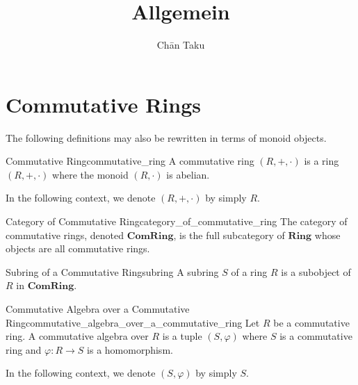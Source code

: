 \documentclass{article}
\title{Allgemein}
\author{Ch\=an Taku}
\begin{document}
\maketitle

\section{Commutative Rings}

The following definitions may also be rewritten in terms of monoid objects.

\begin{definition}{Commutative Ring}{commutative_ring}
    A commutative ring $(R,+,\cdot)$ is a ring $(R,+,\cdot)$ where the monoid $(R,\cdot)$ is abelian.
\end{definition}

In the following context, we denote $(R,+,\cdot)$ by simply $R$.

\begin{definition}{Category of Commutative Ring}{category_of_commutative_ring}
    The category of commutative rings, denoted $\mathbf{ComRing}$,
    is the full subcategory of $\mathbf{Ring}$ whose objects are all commutative rings.
\end{definition}

\begin{definition}{Subring of a Commutative Ring}{subring}
    A subring $S$ of a ring $R$ is a subobject of $R$ in $\mathbf{ComRing}$.
\end{definition}

\begin{definition}{Commutative Algebra over a Commutative Ring}{commutative_algebra_over_a_commutative_ring}
    Let $R$ be a commutative ring.
    A commutative algebra over $R$ is a tuple $(S,\varphi)$ where $S$ is a commutative ring and $\varphi: R\rightarrow S$ is a homomorphism.
\end{definition}

In the following context, we denote $(S,\varphi)$ by simply $S$.
\end{document}
